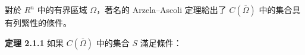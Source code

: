 \documentclass[11pt,a4paper,twoside]{article}
\newif\ifstudynotes
\newcommand{\StudyNote}[2]{%
    \ifstudynotes
    \begin{studyNote}[title={#1}]
    #2
    \end{studyNote}
    \fi
}
\newcommand{\pnum}[1]{%
    \makebox[0pt][r]{%
        \scriptsize\textbf{[#1]}\hspace{0.7em}%
    }%
}
\begin{document}
\StudyNote{複習註解：定義 3 的四個集合性質}{
    設 $A\subset E$，其中 $E$ 是 Banach 空間。這四個概念可以用不同的「問題」來區分。

    \textbf{（i）有界：}是否存在固定常數 $C$，使所有 $u\in A$ 都滿足
    $\|u\|\le C$？

    直覺上就是：
    \[
        \boxed{\text{集合中的元素不會無限制地往外跑。}}
    \]

    \textbf{（ii）閉：}若 $A$ 中的 Cauchy 序列有極限，這個極限是否仍留在 $A$ 中？

    可以記成：
    \[
        \boxed{\text{閉集不會漏掉自己的極限。}}
    \]

    例如 $[0,1]$ 是閉集；但 $(0,1)$ 不是，因為序列
    $x_n=\frac1n$ 全部屬於 $(0,1)$，卻有 $x_n\to0$，而 $0\notin(0,1)$。

    \textbf{（iii）稠密：}若 $S\subset A$，而 $A$ 中每一個元素 $u$
    都能被 $S$ 中的一個序列 $\{u_n\}$ 逼近，即 $u_n\to u$，
    則稱 $S$ 在 $A$ 中稠密。

    直覺上就是：
    \[
        \boxed{\text{較小的集合 }S\text{ 可以任意逼近 }A\text{ 中的元素。}}
    \]

    例如 $\mathbb{Q}$ 在 $\mathbb{R}$ 中稠密。

    \textbf{（iv）列緊：}集合中的元素即使形成一個本身不收斂的序列，
    仍可以從中抽出一個收斂子序列。

    可以記成：
    \[
        \boxed{\text{原序列不必收斂，但總能抽出收斂的一部分。}}
    \]

    若列緊集又是閉集，依本書定義稱為緊集，因此目前可以先記成
    \[
        \boxed{\text{緊集}=\text{列緊}+\text{閉}.}
    \]

    四個概念最簡單的區分為：
    \[
        \begin{array}{c|c}
            \text{性質} & \text{核心問題}        \\
            \hline
            \text{有界} & \text{元素會不會跑到無窮遠？} \\
            \text{閉}  & \text{極限會不會跑出集合？}  \\
            \text{稠密} & \text{能不能用較小集合逼近？} \\
            \text{列緊} & \text{能不能抽出收斂子序列？}
        \end{array}
    \]
}
\noindent
\pnum{50}
對於 $R^n$ 中的有界區域 $\Omega$，著名的 Arzela--Ascoli 定理給出了
$C(\overline{\Omega})$ 中的集合具有列緊性的條件。

\noindent
\pnum{51}
\textbf{定理 2.1.1}\quad
如果 $C(\overline{\Omega})$ 中的集合 $S$ 滿足條件：
\end{document}
